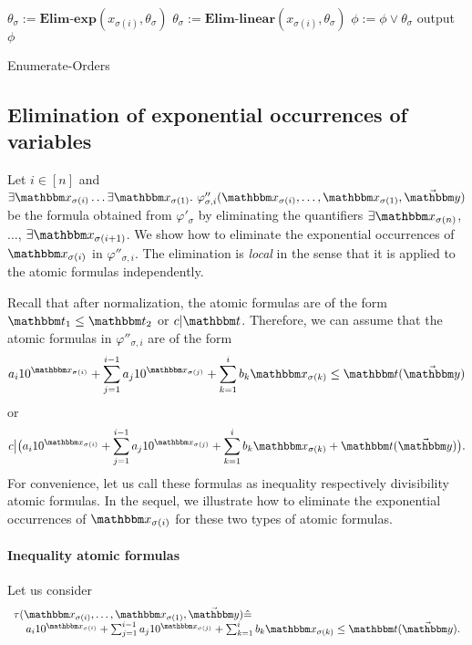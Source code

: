 {\begin{algorithm}[t]
{        
        {
            $\theta_{\sigma}:= \textbf{Elim-exp}(x_{\sigma(i)},\theta_{\sigma})$\;
            $\theta_{\sigma}:= \textbf{Elim-linear}(x_{\sigma(i)},\theta_{\sigma})$\;
        }
        $\phi :=  \phi \vee \theta_{\sigma}$\;
    }
    output $\phi$
    \caption{Enumerate-Orders}
\end{algorithm}
}


\subsection{Elimination of  exponential occurrences of variables}\label{sec-elim-exp}

Let $i \in [n]$ and $\exists \ivarx_{\sigma(i)} \ldots \exists \ivarx_{\sigma(1)}.\ \varphi''_{\sigma,i}(\ivarx_{\sigma(i)}, \ldots, \ivarx_{\sigma(1)}, \vec{\ivary})$ be the formula obtained from $\varphi'_\sigma$ by eliminating the quantifiers $\exists \ivarx_{\sigma(n)}$, $\ldots$, $\exists \ivarx_{\sigma(i+1)}$. We show how to eliminate the exponential occurrences of $\ivarx_{\sigma(i)}$ in $\varphi''_{\sigma,i}$. The elimination is \emph{local} in the sense that it is applied to the atomic formulas independently. 

Recall that after normalization, the atomic formulas are of the form $\iterm_1 \le \iterm_2$ or $c | \iterm$. Therefore, we can assume that the atomic formulas in $\varphi''_{\sigma,i}$ are  of the form 
%
$$a_i 10^{\ivarx_{\sigma(i)}}+\sum_{j=1}^{i-1} a_j 10^{\ivarx_{\sigma(j)}} + \sum_{k=1}^{i}b_k \ivarx_{\sigma(k)} \le \iterm(\vec{\ivary})$$
or  
$$c \big | \big(a_i 10^{\ivarx_{\sigma(i)}}+\sum_{j=1}^{i-1} a_j 10^{\ivarx_{\sigma(j)}} + \sum_{k=1}^{i}b_k \ivarx_{\sigma(k)} + \iterm(\vec{\ivary})\big).$$
%
For convenience, let us call these formulas as inequality respectively divisibility atomic formulas. In the sequel, we illustrate how to eliminate the exponential occurrences of $\ivarx_{\sigma(i)}$ for these two types of atomic formulas.

\medskip

\paragraph{Inequality atomic formulas} Let us consider 
$$
\begin{array}{l}
\tau(\ivarx_{\sigma(i)}, \ldots, \ivarx_{\sigma(1)}, \vec{\ivary}) \Def  \\
\hspace{4mm} 
a_i 10^{\ivarx_{\sigma(i)}}+\sum_{j=1}^{i-1} a_j 10^{\ivarx_{\sigma(j)}} + \sum_{k=1}^{i}b_k \ivarx_{\sigma(k)} \le \iterm(\vec{\ivary}).
\end{array}
$$

